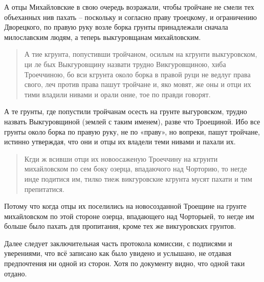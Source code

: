 А отцы Михайловские в свою очередь возражали, чтобы тройчане не смели тех объеханных нив пахать – поскольку и согласно праву троецкому, и ограничению Дворецкого, по правую руку возле борка грунты принадлежали сначала милославским людям, а теперь выкгуровщанам михайловским.

\begin{quotation}
А тие кгрунта, попустивши тройчаном, осилым на кгрунти выкгуровском, ци ле бых Выкгуровщину назвати трудно Викгуровщиною, хиба Троеччиною, бо вси кгрунта около борка в правой руци не ведлуг права свого, леч против права пашут тройчане и, яко мовят, же оны и отци их тими владили нивами и орали оние, тое по правди говорят. 
\end{quotation}

А те грунты, где попустили тройчанам осесть на грунте выгуровском, трудно назвать Выкгуровщиной (землей с таким именем), разве что Троещиной. Ибо все грунты около борка по правую руку, не по «праву», но вопреки, пашут тройчане, истинно утверждая, что они и отцы их владели теми нивами и пахали их.

\begin{quotation}
Кгди ж всивши отци их новоосаженую Троеччину на кгрунти михайловском по сем боку озерца, впадаючого над Чорторию, то негде инде подитися им, тилко тиеж викгуровские кгрунта мусят пахати и тим препитатися. 
\end{quotation}

Потому что когда отцы их поселились на новосозданной Троещине на грунте михайловском по этой стороне озерца, впадающего над Чорторыей, то негде им больше было пахать для пропитания, кроме тех же викгуровских грунтов.

Далее следует заключительная часть протокола комиссии, с подписями и уверениями, что всё записано как было увидено и услышано, не отдавая предпочтения ни одной из сторон. Хотя по документу видно, что одной таки отдано.

